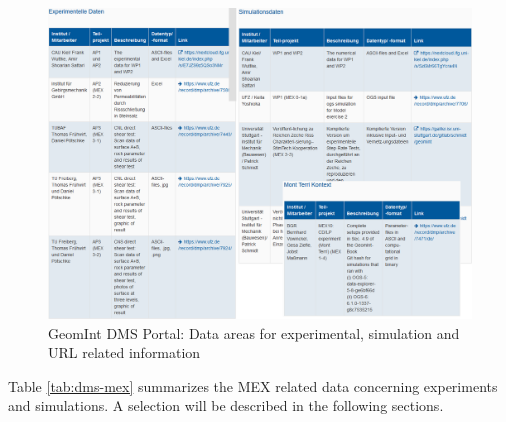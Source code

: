 \begin{figure}[!ht]
\includegraphics[width=\textwidth]{figures/geomint-dms-ove.png}
\caption{GeomInt DMS Portal: Data areas for experimental, simulation and URL related information}
\label{fig:geomint-dms-ove}
\end{figure}

Table \ref{tab:dms-mex} summarizes the MEX related data concerning experiments and simulations.
A selection will be described in the following sections.


